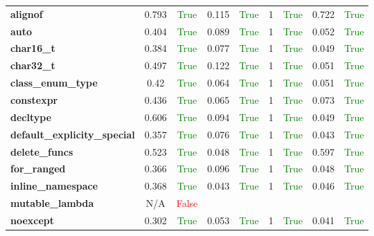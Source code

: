 \documentclass{article}
\begin{document}
\begin{xltabular}{\textwidth}{lcccccccc}
\textbf{{\fontsize{10}{12}\selectfont alignof}}& 0.793&\textcolor{green}{True}& 0.115&\textcolor{green}{True}& 1&\textcolor{green}{True}& 0.722&\textcolor{green}{True} \\[0.5ex]
\textbf{{\fontsize{10}{12}\selectfont auto}}& 0.404&\textcolor{green}{True}& 0.089&\textcolor{green}{True}& 1&\textcolor{green}{True}& 0.052&\textcolor{green}{True} \\[0.5ex]
\textbf{{\fontsize{10}{12}\selectfont char16\_t}}& 0.384&\textcolor{green}{True}& 0.077&\textcolor{green}{True}& 1&\textcolor{green}{True}& 0.049&\textcolor{green}{True} \\[0.5ex]
\textbf{{\fontsize{10}{12}\selectfont char32\_t}}& 0.497&\textcolor{green}{True}& 0.122&\textcolor{green}{True}& 1&\textcolor{green}{True}& 0.051&\textcolor{green}{True} \\[0.5ex]
\textbf{{\fontsize{10}{12}\selectfont class\_enum\_type}}& 0.42&\textcolor{green}{True}& 0.064&\textcolor{green}{True}& 1&\textcolor{green}{True}& 0.051&\textcolor{green}{True} \\[0.5ex]
\textbf{{\fontsize{10}{12}\selectfont constexpr}}& 0.436&\textcolor{green}{True}& 0.065&\textcolor{green}{True}& 1&\textcolor{green}{True}& 0.073&\textcolor{green}{True} \\[0.5ex]
\textbf{{\fontsize{10}{12}\selectfont decltype}}& 0.606&\textcolor{green}{True}& 0.094&\textcolor{green}{True}& 1&\textcolor{green}{True}& 0.049&\textcolor{green}{True} \\[0.5ex]
\textbf{{\fontsize{10}{12}\selectfont default\_explicity\_special}}& 0.357&\textcolor{green}{True}& 0.076&\textcolor{green}{True}& 1&\textcolor{green}{True}& 0.043&\textcolor{green}{True} \\[0.5ex]
\textbf{{\fontsize{10}{12}\selectfont delete\_funcs}}& 0.523&\textcolor{green}{True}& 0.048&\textcolor{green}{True}& 1&\textcolor{green}{True}& 0.597&\textcolor{green}{True} \\[0.5ex]
\textbf{{\fontsize{10}{12}\selectfont for\_ranged}}& 0.366&\textcolor{green}{True}& 0.096&\textcolor{green}{True}& 1&\textcolor{green}{True}& 0.048&\textcolor{green}{True} \\[0.5ex]
\textbf{{\fontsize{10}{12}\selectfont inline\_namespace}}& 0.368&\textcolor{green}{True}& 0.043&\textcolor{green}{True}& 1&\textcolor{green}{True}& 0.046&\textcolor{green}{True} \\[0.5ex]
\textbf{{\fontsize{10}{12}\selectfont mutable\_lambda}}& N/A&\textcolor{red}{False} \\[0.5ex]
\textbf{{\fontsize{10}{12}\selectfont noexcept}}& 0.302&\textcolor{green}{True}& 0.053&\textcolor{green}{True}& 1&\textcolor{green}{True}& 0.041&\textcolor{green}{True} \\[0.5ex]

\end{xltabular}
\end{document}
